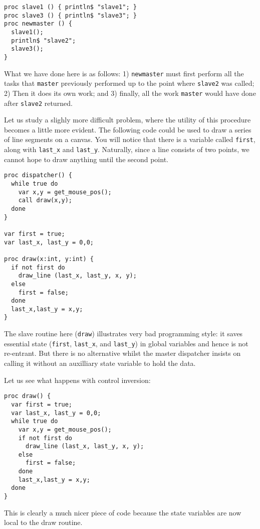 \documentclass{article}
\begin{document}
\begin{verbatim}
proc slave1 () { println$ "slave1"; }
proc slave3 () { println$ "slave3"; }
proc newmaster () { 
  slave1();
  println$ "slave2"; 
  slave3();
}
\end{verbatim}

What we have done here is as follows: 
1) {\tt newmaster} must first perform all the tasks 
   that {\tt master} previously performed up to the point where {\tt slave2} was called;
2) Then it does its own work; and 
3) finally, all the work {\tt master} would have done after {\tt slave2} returned.

Let us study a slighly more difficult problem, where the utility of this procedure becomes a little more evident.
The following code could be used to draw a series of line segments on a canvas.
You will notice that there is a variable called {\tt first}, along with {\tt last_x} and {\tt last_y}. 
Naturally, since a line consists of two points, we cannot hope to draw anything until the second point.


\begin{verbatim}
proc dispatcher() {
  while true do
    var x,y = get_mouse_pos();
    call draw(x,y);
  done
}

var first = true;
var last_x, last_y = 0,0;

proc draw(x:int, y:int) {
  if not first do
    draw_line (last_x, last_y, x, y);
  else
    first = false;
  done
  last_x,last_y = x,y;
}
\end{verbatim}

The slave routine here ({\tt draw}) illustrates very bad programming style:
  it saves essential state ({\tt first}, {\tt last_x}, and {\tt last_y}) in global variables 
  and hence is not re-entrant. 
But there is no alternative 
  whilst the master dispatcher insists on calling it 
  without an auxilliary state variable to hold the data. 

Let us see what happens with control inversion:

\begin{verbatim}
proc draw() {
  var first = true;
  var last_x, last_y = 0,0;
  while true do
    var x,y = get_mouse_pos();
    if not first do
      draw_line (last_x, last_y, x, y);
    else
      first = false;
    done
    last_x,last_y = x,y;
  done
}
\end{verbatim}

This is clearly a much nicer piece of code because the state
variables are now local to the draw routine.
\end{document}
